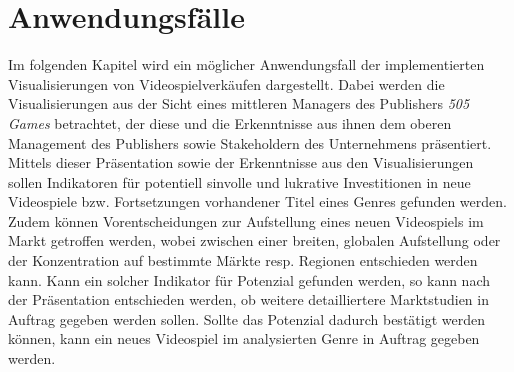 \documentclass[usegeometry=true]{scrartcl}
\begin{document}

\section{Anwendungsfälle}
Im folgenden Kapitel wird ein möglicher Anwendungsfall der implementierten Visualisierungen von Videospielverkäufen dargestellt.
Dabei werden die Visualisierungen aus der Sicht eines mittleren Managers des Publishers \textit{505 Games} betrachtet, der diese und die Erkenntnisse aus ihnen dem oberen Management des Publishers sowie Stakeholdern des Unternehmens präsentiert. 
Mittels dieser Präsentation sowie der Erkenntnisse aus den Visualisierungen sollen Indikatoren für potentiell sinvolle und lukrative Investitionen in neue Videospiele bzw. Fortsetzungen vorhandener Titel eines Genres gefunden werden. 
Zudem können Vorentscheidungen zur Aufstellung eines neuen Videospiels im Markt getroffen werden, wobei zwischen einer breiten, globalen Aufstellung oder der Konzentration auf bestimmte Märkte resp. Regionen entschieden werden kann.
Kann ein solcher Indikator für Potenzial gefunden werden, so kann nach der Präsentation entschieden werden, ob weitere detailliertere Marktstudien in Auftrag gegeben werden sollen. 
Sollte das Potenzial dadurch bestätigt werden können, kann ein neues Videospiel im analysierten Genre in Auftrag gegeben werden.

\end{document}
